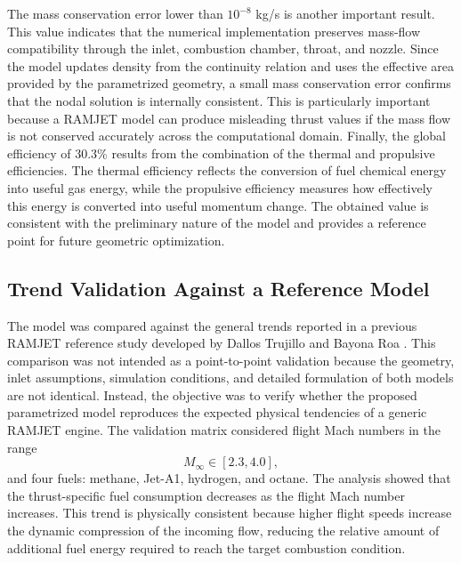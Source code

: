 \documentclass[preprint,12pt]{elsarticle}
\begin{document}
The mass conservation error lower than $10^{-8}$ kg/s is another important result. This value indicates that the numerical implementation preserves mass-flow compatibility through the inlet, combustion chamber, throat, and nozzle. Since the model updates density from the continuity relation and uses the effective area provided by the parametrized geometry, a small mass conservation error confirms that the nodal solution is internally consistent. This is particularly important because a RAMJET model can produce misleading thrust values if the mass flow is not conserved accurately across the computational domain.
Finally, the global efficiency of $30.3\%$ results from the combination of the thermal and propulsive efficiencies. The thermal efficiency reflects the conversion of fuel chemical energy into useful gas energy, while the propulsive efficiency measures how effectively this energy is converted into useful momentum change. The obtained value is consistent with the preliminary nature of the model and provides a reference point for future geometric optimization.
\subsection{Trend Validation Against a Reference Model}
The model was compared against the general trends reported in a previous RAMJET reference study developed by Dallos Trujillo and Bayona Roa \cite{Dallos2024}. This comparison was not intended as a point-to-point validation because the geometry, inlet assumptions, simulation conditions, and detailed formulation of both models are not identical. Instead, the objective was to verify whether the proposed parametrized model reproduces the expected physical tendencies of a generic RAMJET engine.
The validation matrix considered flight Mach numbers in the range
\begin{equation}
M_\infty \in [2.3,4.0],
\end{equation}
and four fuels: methane, Jet-A1, hydrogen, and octane. The analysis showed that the thrust-specific fuel consumption decreases as the flight Mach number increases. This trend is physically consistent because higher flight speeds increase the dynamic compression of the incoming flow, reducing the relative amount of additional fuel energy required to reach the target combustion condition.
\end{document}
